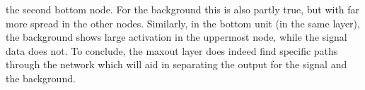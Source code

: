the second bottom node. For the background this is also partly true, but with far more 
spread in the other nodes. Similarly, in the bottom unit (in the same layer), the background shows large
activation in the uppermost node, while the signal data does not. To conclude, the maxout layer does indeed 
find specific paths through the network which will aid in separating the output for the signal and the background.\\
\begin{figure}
\end{figure}
